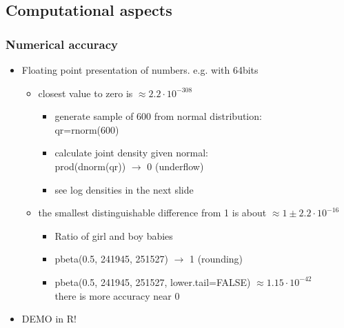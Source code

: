\documentclass[10pt]{beamer}
\begin{document}
\begin{frame}

\subsection{Computational aspects}

\frametitle{Numerical accuracy}

  \begin{itemize}
  \item Floating point presentation of numbers. e.g. with 64bits
    \begin{itemize}
    \item closest value to zero is $\approx 2.2\cdot 10^{-308}$
      \begin{itemize}
      \item generate sample of 600 from normal distribution:\\
        {\color{uured} qr=rnorm(600)}
      \item calculate joint density given normal:\\
        {\color{uured} prod(dnorm(qr)) $\rightarrow$} {\color{red} 0 (underflow)}
      \item<2-> see log densities in the next slide
      \end{itemize}
    \item<3-> the smallest distinguishable difference from 1 is about $\approx 1 \pm  2.2\cdot 10^{-16}$
      \begin{itemize}
      \item<3-> Ratio of girl and boy babies
      \item<3-> {\color{uured} pbeta(0.5, 241945, 251527) $\rightarrow$} {\color{red}  1 (rounding)}
      \item<4-> {\color{uured} pbeta(0.5, 241945, 251527, lower.tail=FALSE) $\approx 1.15\cdot 10^{-42}$}\\
        there is more accuracy near 0
      \end{itemize}
    \end{itemize}
    \item<5->DEMO in R!
  \end{itemize}

\end{frame}
\end{document}
